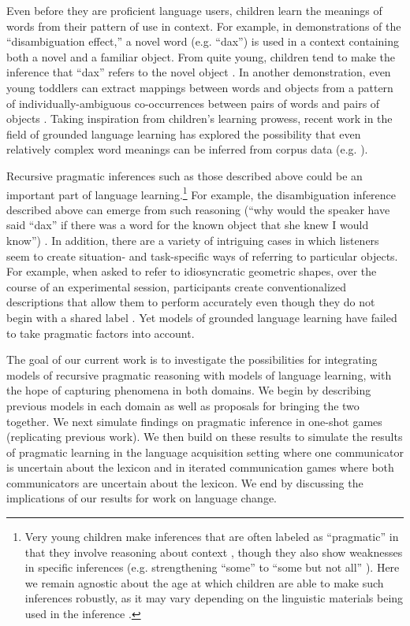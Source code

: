 \documentclass{article} %
\begin{document}
Even before they are proficient language users, children learn the
meanings of words from their pattern of use in context. For example,
in demonstrations of the ``disambiguation effect,'' a novel word
(e.g. ``dax'') is used in a context containing both a novel and a
familiar object. From quite young, children tend to make the inference
that ``dax'' refers to the novel object \cite{markman1988}. In another
demonstration, even young toddlers can extract mappings between words
and objects from a pattern of individually-ambiguous co-occurrences
between pairs of words and pairs of objects \cite{smith2008}. Taking
inspiration from children's learning prowess, recent work in the field
of grounded language learning has explored the possibility that even
relatively complex word meanings can be inferred from corpus data
(e.g. \cite{zettlemoyer2005,chen2008,frank2009,kwiatkowski2010,johnson2012}).

Recursive pragmatic inferences such as those described above could be
an important part of language learning.\footnote{Very young children
  make inferences that are often labeled as ``pragmatic'' in that they
  involve reasoning about context \cite{clark1988,baldwin1993}, though
  they also show weaknesses in specific inferences (e.g. strengthening
  ``some'' to ``some but not all'' \cite{papafragou2003}). Here we
  remain agnostic about the age at which children are able to make
  such inferences robustly, as it may vary depending on the linguistic
  materials being used in the inference \cite{barner2011}.} For
example, the disambiguation inference described above can emerge from
such reasoning (``why would the speaker have said ``dax'' if there was
a word for the known object that she knew I would know'')
\cite{clark1988}. In addition, there are a variety of intriguing cases
in which listeners seem to create situation- and task-specific ways of
referring to particular objects. For example, when asked to refer to
idiosyncratic geometric shapes, over the course of an experimental
session, participants create conventionalized descriptions that allow
them to perform accurately even though they do not begin with a shared
label \cite{krauss1964,clark1986}. Yet models of grounded language
learning have failed to take pragmatic factors into account.

The goal of our current work is to investigate the possibilities for
integrating models of recursive pragmatic reasoning with models of
language learning, with the hope of capturing phenomena in both
domains. We begin by describing previous models in each domain as well
as proposals for bringing the two together. We next simulate findings
on pragmatic inference in one-shot games (replicating previous
work). We then build on these results to simulate the results of pragmatic
learning in the language acquisition setting where one communicator is
uncertain about the lexicon and in iterated communication games where both
communicators are uncertain about the lexicon. We end by discussing the implications of our results for
work on language change.
\end{document}
